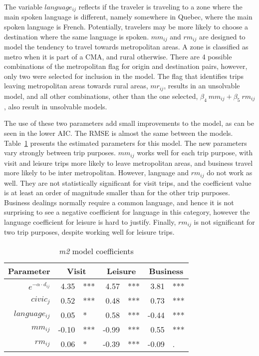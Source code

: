 The variable $language_{ij}$ reflects if the traveler is traveling to a zone where the main spoken language is different, namely somewhere in Quebec, where the main spoken language is French. Potentially, travelers may be more likely to choose a destination where the same language is spoken. $mm_{ij}$ and $rm_{ij}$ are designed to model the tendency to travel towards metropolitan areas. A zone is classified as metro when it is part of a CMA, and rural otherwise. There are 4 possible combinations of the metropolitan flag for origin and destination pairs, however, only two were selected for inclusion in the model. The flag that identifies trips leaving metropolitan areas towards rural areas, $mr_{ij}$, results in an unsolvable model, and all other combinations, other than the one selected, $\beta_4~mm_{ij} + \beta_5~rm_{ij}$, also result in unsolvable models. 


The use of these two parameters add small improvements to the model, as can be seen in the lower AIC. The RMSE is almost the same between the models. Table~\ref{table:m2-coeff} presents the estimated parameters for this model. The new parameters vary strongly between trip purposes. 
$mm_{ij}$  works well for each trip purpose, with visit and leisure trips more likely to leave metropolitan areas, and business travel more likely to be inter metropolitan. However, language and $rm_{ij}$  do not work as well. They are not statistically significant for visit trips, and the coefficient value is at least an order of magnitude smaller than for the other trip purposes. Business dealings normally require a common language, and hence it is not surprising to see a negative coefficient for language in this category, however the language coefficient for leisure is hard to justify. Finally, $rm_{ij}$  is not significant for two trip purposes, despite working well for leisure trips. 

\begin{table}[H]
\centering
\caption{\textit{m2} model coefficients}
\label{table:m2-coeff}
\begin{tabular}{@{}rrlrlrl@{}}
  \toprule
 Parameter & \multicolumn{2}{c}{Visit} & \multicolumn{2}{c}{Leisure} & \multicolumn{2}{c}{Business} \\ \midrule
  $e^{-\alpha  \cdot d_{ij}}$ 	& 4.35 & *** & 4.57 & *** & 3.81 & *** \\  
  $civic_j$ 		& 0.52 	& *** & 0.48 & *** & 0.73 & *** \\  
  $language_{ij}$ 	& 0.05 & * & 0.58 & *** & -0.44 & *** \\ 
  $mm_{ij}$  		& -0.10 & *** & -0.99 & *** & 0.55 & *** \\ 
  $rm_{ij}$			& 0.06 & * & -0.39 & *** & -0.09 & . \\  
   \bottomrule
\end{tabular}
\end{table}

